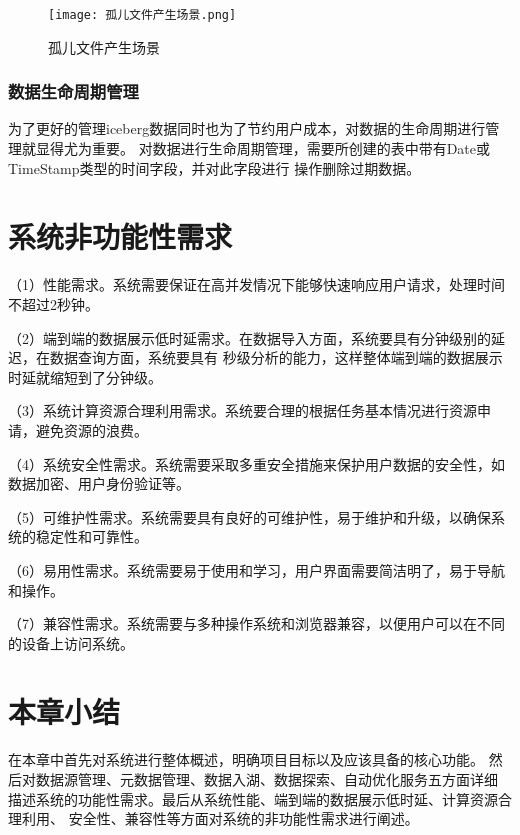 \begin{figure}[H]
  \centering
  \texttt{[image: 孤儿文件产生场景.png]}
  \caption{孤儿文件产生场景}
  \label{fig:孤儿文件产生场景}
\end{figure}

\subsubsection{数据生命周期管理}

为了更好的管理iceberg数据同时也为了节约用户成本，对数据的生命周期进行管理就显得尤为重要\cite{36}。
对数据进行生命周期管理，需要所创建的表中带有Date或TimeStamp类型的时间字段，并对此字段进行
操作删除过期数据。

\section{系统非功能性需求}

（1）性能需求。系统需要保证在高并发情况下能够快速响应用户请求，处理时间不超过2秒钟。

（2）端到端的数据展示低时延需求。在数据导入方面，系统要具有分钟级别的延迟，在数据查询方面，系统要具有
秒级分析的能力，这样整体端到端的数据展示时延就缩短到了分钟级。

（3）系统计算资源合理利用需求。系统要合理的根据任务基本情况进行资源申请，避免资源的浪费。

（4）系统安全性需求。系统需要采取多重安全措施来保护用户数据的安全性，如数据加密、用户身份验证等。

（5）可维护性需求。系统需要具有良好的可维护性，易于维护和升级，以确保系统的稳定性和可靠性。

（6）易用性需求。系统需要易于使用和学习，用户界面需要简洁明了，易于导航和操作。

（7）兼容性需求。系统需要与多种操作系统和浏览器兼容，以便用户可以在不同的设备上访问系统。

\section{本章小结}

在本章中首先对系统进行整体概述，明确项目目标以及应该具备的核心功能。
然后对数据源管理、元数据管理、数据入湖、数据探索、自动优化服务五方面详细
描述系统的功能性需求。最后从系统性能、端到端的数据展示低时延、计算资源合理利用、
安全性、兼容性等方面对系统的非功能性需求进行阐述。
